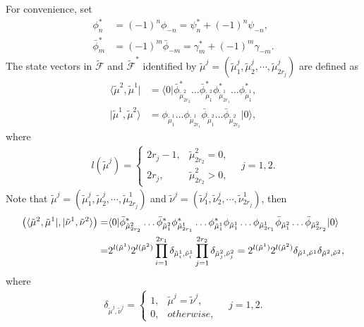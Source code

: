 \documentclass[11pt,reqno]{amsart}
\numberwithin{equation}{section}
\begin{document}
	For convenience, set
	\begin{align}
		\phi_{n}^{*}&=(-1)^{n}\phi_{-n}=\psi_{n}^{*}+(-1)^{n}\psi_{-n},\\
		\bar{\phi}_{m}^{*}&=(-1)^{m}\bar{\phi}_{-m}
		=\gamma_{m}^{*}+(-1)^{m}\gamma_{-m}.
	\end{align}
	The  state vectors in $\tilde{\mathcal{F}}$ and $\tilde{\mathcal{F}}^*$ identified by $\tilde{\mu}^{j}=(\tilde{\mu}_{1}^{j},\tilde{\mu}_{2}^{j},\cdots,\tilde{\mu}_{2r_{j}}^{j})$ are defined as
	\begin{align}
		\langle\tilde{\mu}^{2},\tilde{\mu}^{1}| &= \langle 0|
		\bar{\phi}_{\tilde{\mu}^{2}_{2r_{2}}}^* \dots \bar{\phi}_{\tilde{\mu}^{2}_1}^*
		\phi_{\tilde{\mu}^{1}_{2r_{1}}}^* \dots \phi_{\tilde{\mu}^{1}_1}^*, \label{o-left-state}\\
		|\tilde{\mu}^{1},\tilde{\mu}^{2}\rangle &=
		\phi_{\tilde{\mu}^{1}_1} \dots  \phi_{\tilde{\mu}^{1}_{2r_{1}}}
		\bar{\phi}_{\tilde{\mu}^{2}_1} \dots  \bar{\phi}_{\tilde{\mu}^{2}_{2r_{2}}}
		|0\rangle,   \label{o-right-state}
	\end{align}
	where
	\begin{align}
		l(\tilde{\mu}^{j})=
		\left\{\begin{array}{ll}
			2r_{j}-1, &  \tilde{\mu}^{2}_{2r_{2}}=0,
			\\  2r_{j},& \tilde{\mu}^{2}_{2r_{2}}>0,
		\end{array}
		\right. \quad j=1,2.
	\end{align}
	Note that
	$\tilde{\mu}^{j}=(\tilde{\mu}_{1}^{j},\tilde{\mu}_{2}^{j},\cdots,\tilde{\mu}_{2r_{j}}^{1})$ and
	$\tilde{\nu}^{j}=(\tilde{\nu}_{1}^{j},\tilde{\nu}_{2}^{j},\cdots,\tilde{\nu}_{2r_{j}}^{1})$,
	then
	\begin{align}\label{fock-scalar-product}
		\left( \langle \tilde{\mu}^2,\tilde{\mu}^1|,| \tilde{\nu}^{1},\tilde{\nu}^{2} \rangle \right)
		=&\langle 0|
		\bar{\phi}_{\tilde{\mu}^{2}_{2r_{2}}}^* \dots \bar{\phi}_{\tilde{\mu}^{2}_1}^*
		\phi_{\tilde{\mu}^{1}_{2r_{1}}}^* \dots \phi_{\tilde{\mu}^{1}_1}^*
		\phi_{\tilde{\mu}^{1}_1} \dots  \phi_{\tilde{\mu}^{1}_{2r_{1}}}
		\bar{\phi}_{\tilde{\mu}^{2}_1} \dots  \bar{\phi}_{\tilde{\mu}^{2}_{2r_{2}}}
		|0\rangle \notag\\
		=&2^{l(\tilde{\mu}^1)}2^{l(\tilde{\mu}^2)}
		\prod_{i=1}^{2r_{1}} \delta_{\tilde{\mu}_{i}^1,\tilde{\nu}_{i}^1}
		\prod_{j=1}^{2r_{2}} \delta_{\tilde{\mu}_{j}^2,\tilde{\nu}_{j}^2}
		= 2^{l(\tilde{\mu}^1)}2^{l(\tilde{\mu}^2)}\delta_{\tilde{\mu}^1,\tilde{\nu}^1}\delta_{\tilde{\mu}^2,\tilde{\nu}^2},
	\end{align}
	where
\begin{align}
\delta_{\tilde{\mu}^j,\tilde{\nu}^j}=
\left\{\begin{array}{ll}
	1, & \tilde{\mu}^j=\tilde{\nu}^j,
	\\  0,& otherwise,
\end{array}
\right. \quad j=1,2.		
\end{align}	
	
\end{document}
